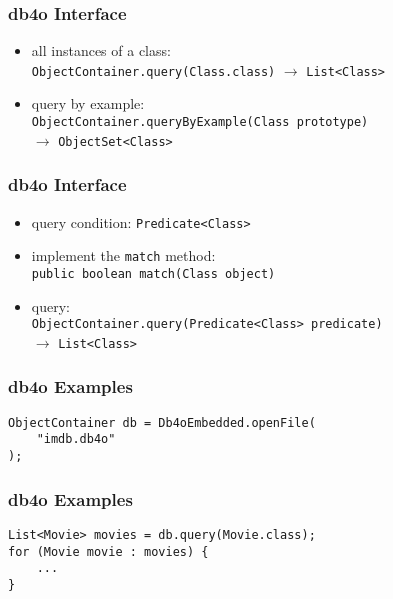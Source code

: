 \documentclass[dvipsnames]{beamer}
\theoremstyle{plain}
\begin{document}
\begin{frame}
  \frametitle{db4o Interface}

  \begin{itemize}
    \item all instances of a class:\\
      \lstinline!ObjectContainer.query(Class.class)!
       $\rightarrow$ \lstinline!List<Class>!

    \pause
    \medskip
    \item query by example:\\
      \lstinline!ObjectContainer.queryByExample(Class prototype)!\\
       $\rightarrow$ \lstinline!ObjectSet<Class>!
  \end{itemize}
\end{frame}

\begin{frame}
  \frametitle{db4o Interface}

  \begin{itemize}
    \item query condition: \lstinline!Predicate<Class>!
    \item implement the \lstinline!match! method:\\
      \lstinline!public boolean match(Class object)!

    \pause
    \medskip
    \item query:\\
      \lstinline!ObjectContainer.query(Predicate<Class> predicate)!\\
      $\rightarrow$ \lstinline!List<Class>!
  \end{itemize}
\end{frame}

\begin{frame}[fragile]
  \frametitle{db4o Examples}

  \begin{example}
    \begin{lstlisting}
ObjectContainer db = Db4oEmbedded.openFile(
    "imdb.db4o"
);
    \end{lstlisting}
  \end{example}
\end{frame}

\begin{frame}[fragile]
  \frametitle{db4o Examples}

  \begin{example}
    \begin{lstlisting}
List<Movie> movies = db.query(Movie.class);
for (Movie movie : movies) {
    ...
}
    \end{lstlisting}
  \end{example}
\end{frame}
\end{document}
